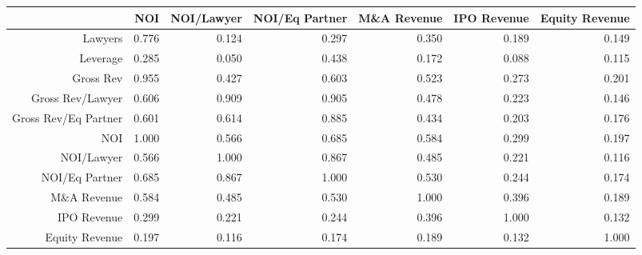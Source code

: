 \begin{table}[ht]
\centering
\begin{tabular}{rrrrrrr}
  \hline
 & NOI & NOI/Lawyer & NOI/Eq Partner & M\&A Revenue & IPO Revenue & Equity Revenue \\ 
  \hline
Lawyers & 0.776 & 0.124 & 0.297 & 0.350 & 0.189 & 0.149 \\ 
  Leverage & 0.285 & 0.050 & 0.438 & 0.172 & 0.088 & 0.115 \\ 
  Gross Rev & 0.955 & 0.427 & 0.603 & 0.523 & 0.273 & 0.201 \\ 
  Gross Rev/Lawyer & 0.606 & 0.909 & 0.905 & 0.478 & 0.223 & 0.146 \\ 
  Gross Rev/Eq Partner & 0.601 & 0.614 & 0.885 & 0.434 & 0.203 & 0.176 \\ 
  NOI & 1.000 & 0.566 & 0.685 & 0.584 & 0.299 & 0.197 \\ 
  NOI/Lawyer & 0.566 & 1.000 & 0.867 & 0.485 & 0.221 & 0.116 \\ 
  NOI/Eq Partner & 0.685 & 0.867 & 1.000 & 0.530 & 0.244 & 0.174 \\ 
  M\&A Revenue & 0.584 & 0.485 & 0.530 & 1.000 & 0.396 & 0.189 \\ 
  IPO Revenue & 0.299 & 0.221 & 0.244 & 0.396 & 1.000 & 0.132 \\ 
  Equity Revenue & 0.197 & 0.116 & 0.174 & 0.189 & 0.132 & 1.000 \\ 
   \hline
\end{tabular}
\end{table}
